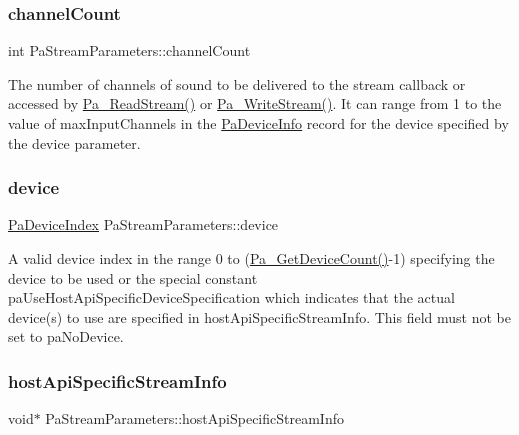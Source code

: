 \subsubsection{\texorpdfstring{channel\+Count}{channelCount}}
{\footnotesize\ttfamily int Pa\+Stream\+Parameters\+::channel\+Count}

The number of channels of sound to be delivered to the stream callback or accessed by \hyperlink{portaudio_8h_a0b62d4b74b5d3d88368e9e4c0b8b2dc7}{Pa\+\_\+\+Read\+Stream()} or \hyperlink{portaudio_8h_a075a6efb503a728213bdae24347ed27d}{Pa\+\_\+\+Write\+Stream()}. It can range from 1 to the value of max\+Input\+Channels in the \hyperlink{struct_pa_device_info}{Pa\+Device\+Info} record for the device specified by the device parameter. \mbox{\label{struct_pa_stream_parameters_aebaf648b4d11dd1252a747b76b8da084}} 
\subsubsection{\texorpdfstring{device}{device}}
{\footnotesize\ttfamily \hyperlink{portaudio_8h_ad79317e65bde63d76c4b8e711ac5a361}{Pa\+Device\+Index} Pa\+Stream\+Parameters\+::device}

A valid device index in the range 0 to (\hyperlink{portaudio_8h_acfe4d3c5ec1a343f459981bfa2057f8d}{Pa\+\_\+\+Get\+Device\+Count()}-\/1) specifying the device to be used or the special constant pa\+Use\+Host\+Api\+Specific\+Device\+Specification which indicates that the actual device(s) to use are specified in host\+Api\+Specific\+Stream\+Info. This field must not be set to pa\+No\+Device. \mbox{\label{struct_pa_stream_parameters_aff01b9fa0710ad1654471e97665c06a9}} 
\subsubsection{\texorpdfstring{host\+Api\+Specific\+Stream\+Info}{hostApiSpecificStreamInfo}}
{\footnotesize\ttfamily void$\ast$ Pa\+Stream\+Parameters\+::host\+Api\+Specific\+Stream\+Info}


